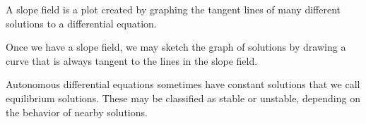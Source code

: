 

\begin{summary}
\item A slope field is a plot created by graphing the tangent lines of
  many different solutions to a differential equation.
\item Once we have a slope field, we may sketch the graph of solutions
  by drawing a curve that is always tangent to the lines in the slope
  field. 
\item Autonomous differential equations sometimes have constant
  solutions that we call 
  equilibrium solutions.  These may be classified as stable or
  unstable, depending on the behavior of nearby solutions.
\end{summary}

\nin \hrulefill

 



\clearpage
